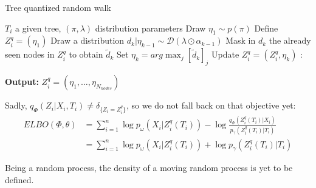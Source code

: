 \begin{algorithm}[H]
    \caption{Tree quantized random walk}
    \begin{algorithmic}
        \REQUIRE $T_i$ a given tree, $(\pi, \lambda)$ distribution parameters
        \STATE Draw $\eta_{1} \sim p(\pi)$
        \STATE Define $Z_i^q = (\eta_{1})$
            \STATE \quad Draw a distribution $d_{k} | \eta_{k-1} \sim \mathcal{D}(\lambda \odot \alpha_{k-1})$
            \STATE \quad Mask in $d_{k}$ the already seen nodes in $Z_i^q$ to obtain $\tilde{d}_{k}$
            \STATE \quad Set $\eta_{k} = arg\max_{j} [\tilde{d}_{k}]_j$
            \STATE \quad Update $Z_i^q = (Z_i^q, \eta_k)$
        \EndFor:
    \end{algorithmic}

    \textbf{Output:} $Z_i^q = (\eta_1, \dots, \eta_{N_{nodes}})$

    \label{alg:tree_quantized_walk}
\end{algorithm}

Sadly, $q_{\Phi}(Z_i|X_i,T_i) \neq \delta_{\{Z_i = Z_i^q\}}$, so we do not fall back on that objective yet:
$$
\begin{align}
    ELBO(\Phi, \theta) &= \sum_{i=1}^n \log p_{\omega}(X_i | Z_i^q(T_i)) - \log \frac{q_{\Phi}(Z_i^q(T_i) | X_i)}{p_{\gamma}(Z_i^q (T_i) | T_i)} \\
    &= \sum_{i=1}^n \log p_{\omega}(X_i | Z_i^q(T_i)) + \log p_{\gamma}(Z_i^q (T_i) | T_i)
\end{align}
$$

Being a random process, the density of a moving random process is yet to be defined.